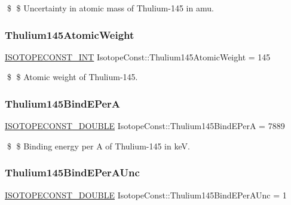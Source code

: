 \$ \$ Uncertainty in atomic mass of Thulium-\/145 in amu. \mbox{\label{group___isotope_const-_thulium-_tm145_gae9b4a7458f68633b43484ac135bfb1b3}} 
\subsubsection{\texorpdfstring{Thulium145\+Atomic\+Weight}{Thulium145AtomicWeight}}
{\footnotesize\ttfamily \mbox{\hyperlink{group___isotope_const-_macros_ga5f18360b3e99483a35c32d789e62621c}{I\+S\+O\+T\+O\+P\+E\+C\+O\+N\+S\+T\+\_\+\+I\+NT}} Isotope\+Const\+::\+Thulium145\+Atomic\+Weight = 145}

\$ \$ Atomic weight of Thulium-\/145. \mbox{\label{group___isotope_const-_thulium-_tm145_gafa8dbf147125434fe838982b157e60a6}} 
\subsubsection{\texorpdfstring{Thulium145\+Bind\+E\+PerA}{Thulium145BindEPerA}}
{\footnotesize\ttfamily \mbox{\hyperlink{group___isotope_const-_macros_ga8f45a7272ce02c0b4c65c44636ed719a}{I\+S\+O\+T\+O\+P\+E\+C\+O\+N\+S\+T\+\_\+\+D\+O\+U\+B\+LE}} Isotope\+Const\+::\+Thulium145\+Bind\+E\+PerA = 7889}

\$ \$ Binding energy per A of Thulium-\/145 in keV. \mbox{\label{group___isotope_const-_thulium-_tm145_ga837e03fdd65b4518e9c3f89348697210}} 
\subsubsection{\texorpdfstring{Thulium145\+Bind\+E\+Per\+A\+Unc}{Thulium145BindEPerAUnc}}
{\footnotesize\ttfamily \mbox{\hyperlink{group___isotope_const-_macros_ga8f45a7272ce02c0b4c65c44636ed719a}{I\+S\+O\+T\+O\+P\+E\+C\+O\+N\+S\+T\+\_\+\+D\+O\+U\+B\+LE}} Isotope\+Const\+::\+Thulium145\+Bind\+E\+Per\+A\+Unc = 1}

